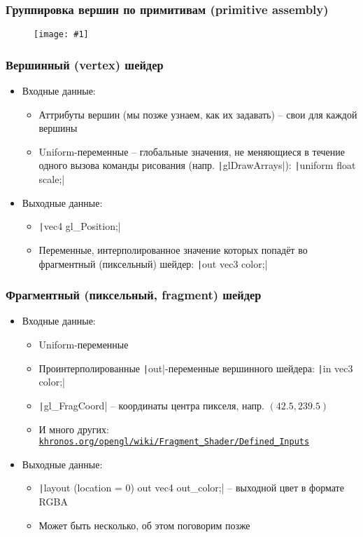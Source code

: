 \documentclass[10pt]{beamer}
\newcommand{\slideimage}[1]{
  \begin{figure}
    \begin{adjustbox}{width=\textwidth, totalheight=\textheight-2\baselineskip-2\baselineskip,keepaspectratio}
      \texttt{[image: \#1]}
    \end{adjustbox}
  \end{figure}
}
\begin{document}

\begin{frame}
\frametitle{Группировка вершин по примитивам (primitive assembly)}
\slideimage{primitives.png}
\end{frame}

\begin{frame}[fragile]
\frametitle{Вершинный (vertex) шейдер}
\begin{itemize}
\pause
\item Входные данные:
\pause
\begin{itemize}
\item Аттрибуты вершин (мы позже узнаем, как их задавать) -- свои для каждой вершины
\pause
\item Uniform-переменные -- глобальные значения, не меняющиеся в течение одного вызова команды рисования (напр. \texttt|glDrawArrays|):
\texttt|uniform float scale;|
\end{itemize}
\pause
\item Выходные данные:
\begin{itemize}
\item \texttt|vec4 gl_Position;|
\pause
\item Переменные, интерполированное значение которых попадёт во фрагментный (пиксельный) шейдер: \texttt|out vec3 color;|
\end{itemize}
\end{itemize}
\end{frame}

\begin{frame}[fragile]
\frametitle{Фрагментный (пиксельный, fragment) шейдер}
\begin{itemize}
\pause
\item Входные данные:
\pause
\begin{itemize}
\item Uniform-переменные
\pause
\item Проинтерполированные \texttt|out|-переменные вершинного шейдера: \texttt|in vec3 color;|
\pause
\item \texttt|gl_FragCoord| -- координаты центра пикселя, напр. \begin{math}(42.5, 239.5)\end{math}
\pause
\item И много других: \href{https://www.khronos.org/opengl/wiki/Fragment_Shader/Defined_Inputs}{\nolinkurl{khronos.org/opengl/wiki/Fragment\_Shader/Defined\_Inputs}}
\end{itemize}
\pause
\item Выходные данные:
\begin{itemize}
\item \texttt|layout (location = 0) out vec4 out_color;| -- выходной цвет в формате RGBA
\pause
\item Может быть несколько, об этом поговорим позже
\end{itemize}
\end{itemize}
\end{frame}
\end{document}
